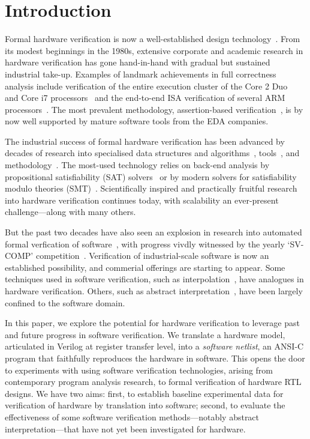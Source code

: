 \section{Introduction}\label{sec:intro}
%
Formal hardware verification is now a well-established design technology~\cite{Seligman:2015:FV}. From its modest beginnings in the 1980s, extensive corporate and academic research in hardware verification has gone hand-in-hand with gradual but sustained industrial take-up. Examples of landmark achievements in full correctness analysis include verification of the entire execution cluster of the Core 2 Duo~\cite{Core2}  and Core i7 processors~\cite{i7} and the end-to-end ISA verification of several ARM processors~\cite{ARM}. The most prevalent methodology, assertion-based verification~\cite{Foster:2009:AAB}, is by now well supported by mature software tools from the EDA companies.

The industrial success of formal hardware verification has been advanced by decades of research into specialised data structures and algorithms~\cite{vis}, tools~\cite{Seger:2005:IEE,abc}, and methodology~\cite{MCMILLAN2000279,Aagaard:2000:MLH}.  The most-used technology relies on back-end analysis by propositional satisfiability (SAT) solvers~\cite{Biere1999} or by modern solvers for satisfiability modulo theories (SMT)~\cite{decision_procedures, DBLP:conf/lpar/AndrausLS08,soc-keating,
DBLP:conf/mtv/SunkariCVM07,DBLP:conf/cav/Bjesse08}. Scientifically inspired and practically fruitful research into hardware verification continues today, with scalability an ever-present challenge---along with many others. 

But the past two decades have also seen an explosion in research into automated formal verfication of software~\cite{dkw2008}, with progress vivdly witnessed by the yearly `SV-COMP' competition~\cite{Beyer2017}.  Verification of industrial-scale software is now an established possibility, and commerial offerings are starting to appear. Some techniques used in software verification, such as interpolation~\cite{Interpolants,Kroening:2011:ISV}, have analogues in hardware verification. Others, such as abstract interpretation~\cite{CousotCousot77,Cousot:1996:AI}, have been largely confined to the software domain.  

In this paper, we explore the potential for hardware verification to leverage past and future progress in software verification. We translate a hardware model, articulated in Verilog at register transfer level, into a \emph{software netlist}, an ANSI-C program that faithfully reproduces the hardware in software. This opens the door to experiments with using software verification technologies, arising from contemporary program analysis research, to formal verification of hardware RTL designs. We have two aims: first, to establish baseline experimental data for verification of hardware by translation into software; second, to evaluate the effectiveness of some software verification methods---notably abstract interpretation---that have not yet been investigated for hardware.

